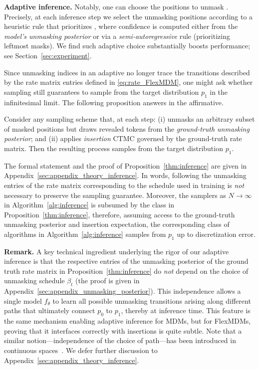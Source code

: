\textbf{Adaptive inference.} Notably, one can choose the positions to unmask . Precisely, at each inference step we select the unmasking positions according to a heuristic rule that prioritizes , where confidence is computed either from the \emph{model’s unmasking posterior} or via a \emph{semi-autoregressive} rule (prioritizing leftmost masks). We find such adaptive choice substantially boosts performance; see Section~\ref{sec:experiment}.

Since unmasking indices in an adaptive no longer trace the transitions described by the rate matrix entries defined in \eqref{eq:rate_FlexMDM}, one might ask whether sampling still guarantees to sample from the target distribution $p_1$ in the infinitesimal limit. The following proposition answers in the affirmative.

\begin{proposition}\label{thm:inference}
Consider any sampling scheme that, at each step: (i) unmasks an arbitrary subset of masked positions but draws revealed tokens from the \emph{ground-truth unmasking posterior}; and (ii) applies \emph{insertion} CTMC governed by the ground-truth rate matrix. Then the resulting process samples from the target distribution $p_1$.
\end{proposition}
The formal statement and the proof of Proposition~\ref{thm:inference} are given in Appendix~\ref{sec:appendix_theory_inference}. In words, following the unmasking entries of the rate matrix corresponding to the schedule used in training is \emph{not} necessary to preserve the sampling guarantee. Moreover, the samplers as $N \to \infty$ in Algorithm~\ref{alg:inference} is subsumed by the class in Proposition~\ref{thm:inference}, therefore, assuming access to the ground-truth unmasking posterior and insertion expectation, the corresponding class of algorithms in Algorithm~\ref{alg:inference} samples from $p_1$ up to discretization error.

\textbf{Remark.} A key technical ingredient underlying the rigor of our adaptive inference is that the respective entries of the unmasking posterior of the ground truth rate matrix in Proposition~\ref{thm:inference} do \emph{not} depend on the choice of unmasking schedule $\beta_t$ (the proof is given in Appendix~\ref{sec:appendix_unmasking_posterior}). This independence allows a single model $f_\theta$ to learn all possible unmasking transitions arising along different paths that ultimately connect $p_0$ to $p_1$, thereby  at inference time. This feature is the same mechanism enabling adaptive inference for MDMs, but for FlexMDMs, proving that it interfaces correctly with insertions is quite subtle. Note that a similar notion—independence of the choice of path—has been introduced in continuous spaces~\cite{albergo2023multi, negrel2025task}. We defer further discussion to Appendix~\ref{sec:appendix_theory_inference}.